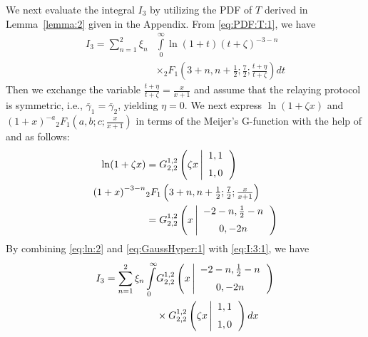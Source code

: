 \documentclass[conference]{IEEEtran}
\newcommand{\snravei}[1]{\bar\gamma_{#1}}
\begin{document}
We next evaluate the integral $I_3$ by utilizing the PDF of $T$
derived in Lemma~\ref{lemma:2} given in the Appendix. From
\eqref{eq:PDF:T:1}, we have
%
%
\begin{align} \label{eq:I:3:1}
    I_3
    =
    \sum\limits_{n=1}^2
    \xi_n
    &\int\limits_{0}^{\infty}
    \ln\left(1+t\right)
    \left(t+\zeta\right)^{-3-n}
    \nonumber
    \\
    &\times
    {_2}F_1\left(3+n,n+\tfrac{1}{2};\tfrac{7}{2};\tfrac{t+\eta}{t+\zeta}\right)
    dt
\end{align}
%
%
Then we exchange the variable $\frac{t+\eta}{t+\zeta}=\frac{x}{x+1}$
and assume that the relaying protocol is symmetric, i.e.,
$\snravei{1}=\snravei{2}$, yielding $\eta=0$. We next express
$\ln(1+ \zeta x)$ and $\left(1+x\right)^{-a}
{_2}F_1\left(a,b;c;\tfrac{x}{x+1}\right)$ in terms of the Meijer's
G-function with the help of \cite[eq.~(8.4.6.5)]{Prudnikov:90:Book}
and \cite[eq.~(8.4.49.26)]{Prudnikov:90:Book} as follows:
%
%
\begin{align} \label{eq:ln:2}
    \ln(1+\zeta x)
    &=
    G_{2,2}^{1,2}\left( {\zeta x} \left|{\begin{array}{*{20}c} {1,1}  \vspace{0.2cm}\\
    {1,0} \end{array}} \right.\right)
    \\ \label{eq:GaussHyper:1}
    \left(1+x\right)^{-3-n}
    &{_2}F_1\left(3+n,n+\tfrac{1}{2};\tfrac{7}{2};\tfrac{x}{x+1}\right)
    \nonumber
    \\
    &=
    G_{2,2}^{1,2}\left( {x} \left|{\begin{array}{*{20}c} {-2-n,\tfrac{1}{2}-n}  \vspace{0.2cm}\\
    {0,-2n} \end{array}} \right.\right)
\end{align}
%
%
By combining \eqref{eq:ln:2} and \eqref{eq:GaussHyper:1} with
\eqref{eq:I:3:1}, we have
%
%
\begin{align} \label{eq:I:3:2}
    I_3
    =
    \sum\limits_{n=1}^2
    \xi_n
    \int\limits_{0}^{\infty}
    &G_{2,2}^{1,2}\left( {x} \left|{\begin{array}{*{20}c} {-2-n,\tfrac{1}{2}-n}  \vspace{0.2cm}\\
    {0,-2n} \end{array}} \right.\right)
    \nonumber
    \\
    &\times
    G_{2,2}^{1,2}\left( {\zeta x} \left|{\begin{array}{*{20}c} {1,1}  \vspace{0.2cm}\\
    {1,0} \end{array}} \right.\right)
    dx
\end{align}
\end{document}
